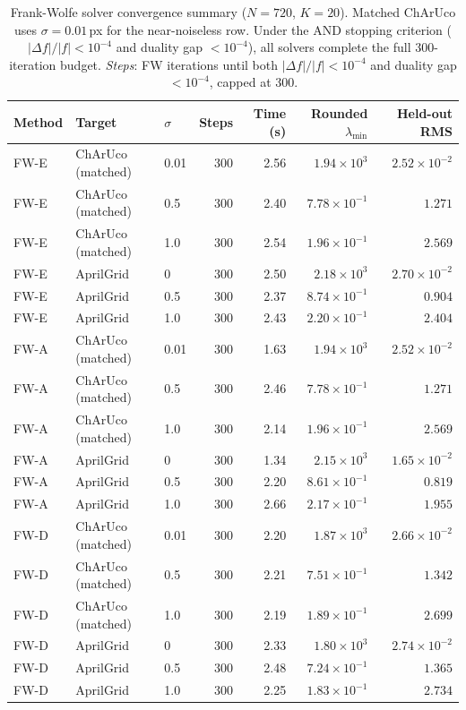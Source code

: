 \documentclass[letterpaper, 9
 pt, conference]{ieeeconf}
\begin{document}
\begin{table}[t]
\centering
\caption{Frank-Wolfe solver convergence summary ($N{=}720$, $K{=}20$).
Matched ChArUco uses $\sigma{=}0.01$\,px for the near-noiseless row.
Under the AND stopping criterion ($|\Delta f|/|f| < 10^{-4}$ and duality gap $<10^{-4}$),
all solvers complete the full 300-iteration budget.
\emph{Steps}: FW iterations until both $|\Delta f|/|f| < 10^{-4}$ and duality gap $<10^{-4}$, capped at 300.}
\label{tab:fw_convergence}
\scriptsize
\setlength{\tabcolsep}{3.5pt}
\begin{tabular}{lllrrrr}
\toprule
Method & Target & $\sigma$ & Steps & Time (s) & Rounded $\lambda_{\min}$ & Held-out RMS\\
\midrule
FW-E & ChArUco (matched) & 0.01 & 300 & 2.56 & $1.94\!\times\!10^{3}$  & $2.52\!\times\!10^{-2}$ \\
FW-E & ChArUco (matched) & 0.5  & 300 & 2.40 & $7.78\!\times\!10^{-1}$ & $1.271$ \\
FW-E & ChArUco (matched) & 1.0  & 300 & 2.54 & $1.96\!\times\!10^{-1}$ & $2.569$ \\
FW-E & AprilGrid         & 0    & 300 & 2.50 & $2.18\!\times\!10^{3}$  & $2.70\!\times\!10^{-2}$ \\
FW-E & AprilGrid         & 0.5  & 300 & 2.37 & $8.74\!\times\!10^{-1}$ & $0.904$ \\
FW-E & AprilGrid         & 1.0  & 300 & 2.43 & $2.20\!\times\!10^{-1}$ & $2.404$ \\
\midrule
FW-A & ChArUco (matched) & 0.01 & 300 & 1.63 & $1.94\!\times\!10^{3}$  & $2.52\!\times\!10^{-2}$ \\
FW-A & ChArUco (matched) & 0.5  & 300 & 2.46 & $7.78\!\times\!10^{-1}$ & $1.271$ \\
FW-A & ChArUco (matched) & 1.0  & 300 & 2.14 & $1.96\!\times\!10^{-1}$ & $2.569$ \\
FW-A & AprilGrid         & 0    & 300 & 1.34 & $2.15\!\times\!10^{3}$  & $1.65\!\times\!10^{-2}$ \\
FW-A & AprilGrid         & 0.5  & 300 & 2.20 & $8.61\!\times\!10^{-1}$ & $0.819$ \\
FW-A & AprilGrid         & 1.0  & 300 & 2.66 & $2.17\!\times\!10^{-1}$ & $1.955$ \\
\midrule
FW-D & ChArUco (matched) & 0.01 & 300 & 2.20 & $1.87\!\times\!10^{3}$  & $2.66\!\times\!10^{-2}$ \\
FW-D & ChArUco (matched) & 0.5  & 300 & 2.21 & $7.51\!\times\!10^{-1}$ & $1.342$ \\
FW-D & ChArUco (matched) & 1.0  & 300 & 2.19 & $1.89\!\times\!10^{-1}$ & $2.699$ \\
FW-D & AprilGrid         & 0    & 300 & 2.33 & $1.80\!\times\!10^{3}$  & $2.74\!\times\!10^{-2}$ \\
FW-D & AprilGrid         & 0.5  & 300 & 2.48 & $7.24\!\times\!10^{-1}$ & $1.365$ \\
FW-D & AprilGrid         & 1.0  & 300 & 2.25 & $1.83\!\times\!10^{-1}$ & $2.734$ \\
\bottomrule
\end{tabular}
\end{table}
\end{document}
